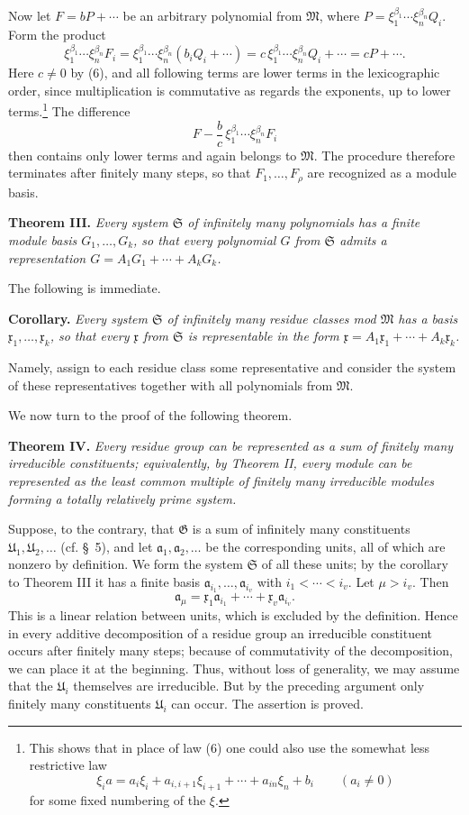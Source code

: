 \documentclass[11pt]{article}
\newcommand{\mM}{\mathfrak{M}}
\newcommand{\mG}{\mathfrak{G}}
\newcommand{\ma}{\mathfrak{a}}
\newcommand{\mx}{\mathfrak{x}}
\newcommand{\mU}{\mathfrak{U}}
\newcommand{\mS}{\mathfrak{S}}
\begin{document}
Now let $F=bP+\cdots$ be an arbitrary polynomial from $\mM$, where $P=\xi_1^{\beta_1}\cdots\xi_n^{\beta_n}Q_i$. Form the product
\[
 \xi_1^{\beta_1}\cdots\xi_n^{\beta_n}F_i
 =\xi_1^{\beta_1}\cdots\xi_n^{\beta_n}(b_iQ_i+\cdots)
 =c\,\xi_1^{\beta_1}\cdots\xi_n^{\beta_n}Q_i+\cdots
 =cP+\cdots.
\]
Here $c\ne0$ by (6), and all following terms are lower terms in the lexicographic order, since multiplication is commutative as regards the exponents, up to lower terms.\footnote{This shows that in place of law (6) one could also use the somewhat less restrictive law
\[
 \xi_i a=a_i\xi_i+a_{i,i+1}\xi_{i+1}+\cdots+a_{in}\xi_n+b_i\qquad(a_i\ne0)
\]
for some fixed numbering of the $\xi$.} The difference
\[
 F-\frac bc\,\xi_1^{\beta_1}\cdots\xi_n^{\beta_n}F_i
\]
then contains only lower terms and again belongs to $\mM$. The procedure therefore terminates after finitely many steps, so that $F_1,
\ldots,F_\rho$ are recognized as a module basis.

\textbf{Theorem III.} \emph{Every system $\mS$ of infinitely many polynomials has a finite module basis $G_1,
\ldots,G_k$, so that every polynomial $G$ from $\mS$ admits a representation $G=A_1G_1+
\cdots+A_kG_k$.}

The following is immediate.

\textbf{Corollary.} \emph{Every system $\mS$ of infinitely many residue classes mod $\mM$ has a basis $\mx_1,
\ldots,\mx_k$, so that every $\mx$ from $\mS$ is representable in the form $\mx=A_1\mx_1+
\cdots+A_k\mx_k$.}

Namely, assign to each residue class some representative and consider the system of these representatives together with all polynomials from $\mM$.

We now turn to the proof of the following theorem.

\textbf{Theorem IV.} \emph{Every residue group can be represented as a sum of finitely many irreducible constituents; equivalently, by Theorem II, every module can be represented as the least common multiple of finitely many irreducible modules forming a totally relatively prime system.}

Suppose, to the contrary, that $\mG$ is a sum of infinitely many constituents $\mU_1,\mU_2,
\ldots$ (cf. \S~5), and let $\ma_1,
\ma_2,
\ldots$ be the corresponding units, all of which are nonzero by definition. We form the system $\mS$ of all these units; by the corollary to Theorem III it has a finite basis $\ma_{i_1},
\ldots,\ma_{i_v}$ with $i_1<\cdots<i_v$. Let $\mu>i_v$. Then
\[
 \ma_\mu=\mx_1\ma_{i_1}+\cdots+\mx_v\ma_{i_v}.
\]
This is a linear relation between units, which is excluded by the definition. Hence in every additive decomposition of a residue group an irreducible constituent occurs after finitely many steps; because of commutativity of the decomposition, we can place it at the beginning. Thus, without loss of generality, we may assume that the $\mU_i$ themselves are irreducible. But by the preceding argument only finitely many constituents $\mU_i$ can occur. The assertion is proved.
\end{document}

